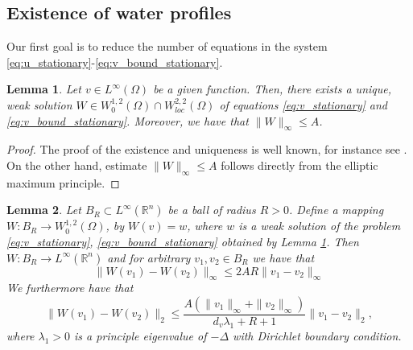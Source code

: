 \documentclass[11pt, a4paper]{article}
\theoremstyle{break}
\theoremstyle{break}
\theoremstyle{break}
\theoremstyle{break}
\theoremstyle{break}
\newtheorem{lem}{Lemma}[section]
\theoremstyle{break}
\theoremstyle{break}
\begin{document}
\subsection{Existence of water profiles} Our first goal is to reduce the number of equations in the system \eqref{eq:u_stationary}-\eqref{eq:v_bound_stationary}.
\begin{lem}
    \label{lem:existence_of_inhomogeneous_elliptic_v}
    Let $v \in L^\infty(\Omega)$ be a given function. Then, there exists a unique, weak solution $W \in W^{1,2}_0(\Omega) \cap W^{2,2}_{loc}(\Omega)$ of equations \eqref{eq:v_stationary} and \eqref{eq:v_bound_stationary}. Moreover, we have that $\|W \|_\infty \leq A$.
\end{lem}
\begin{proof}
    The proof of the existence and uniqueness is well known, for instance see \cite[Theorem 8.9]{gilbarg2001elliptic}. On the other hand, estimate $\|W\|_\infty \leq A$ follows directly from the elliptic maximum principle.
\end{proof}

\begin{lem}
    \label{lem:stationary_v_lipschitz_constant}
    Let $B_R \subset L^\infty(\mathbb{R}^n)$ be a ball of radius $R > 0$.
    Define a mapping $W : B_R \rightarrow W^{1,2}_0(\Omega)$, by $W(v) = w$, where $w$ is a weak solution of the problem \eqref{eq:v_stationary}, \eqref{eq:v_bound_stationary} obtained by Lemma \ref{lem:existence_of_inhomogeneous_elliptic_v}. Then $W: B_R \rightarrow L^\infty(\mathbb{R}^n)$ and for arbitrary $v_1, v_2 \in B_R$ we have that
    \begin{equation}
        \|W(v_1) - W(v_2)\|_\infty \leq 2 A R \|v_1 - v_2\|_\infty
    \end{equation}
    We furthermore have that 
    \begin{equation}
        \|W(v_1) - W(v_2)\|_2 \leq \frac{A(\|v_1\|_\infty + \|v_2\|_\infty)}{d_v \lambda_1 + R + 1} \|v_1-v_2\|_2,
    \end{equation}
    where $\lambda_1 > 0$ is a principle eigenvalue of $-\Delta$ with Dirichlet boundary condition.
\end{lem}
\end{document}
